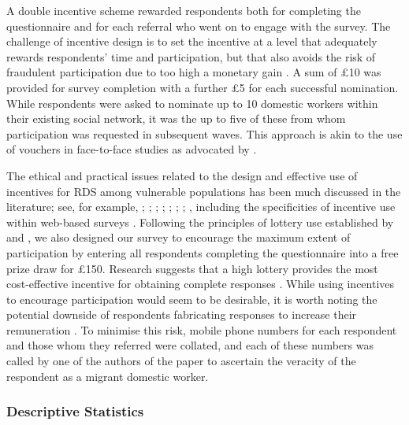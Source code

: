 \documentclass[
  12pt,
  letterpaper,
  DIV=11,
  numbers=noendperiod]{scrartcl}
\theoremstyle{plain}
\theoremstyle{definition}
\begin{document}
A double incentive scheme rewarded respondents both for completing the
questionnaire and for each referral who went on to engage with the
survey. The challenge of incentive design is to set the incentive at a
level that adequately rewards respondents' time and participation, but
that also avoids the risk of fraudulent participation due to too high a
monetary gain \autocite{jordan_overcoming_2020}. A sum of £10 was
provided for survey completion with a further £5 for each successful
nomination. While respondents were asked to nominate up to 10 domestic
workers within their existing social network, it was the up to five of
these from whom participation was requested in subsequent waves. This
approach is akin to the use of vouchers in face-to-face studies as
advocated by \textcite{thompson_new_2020}.

The ethical and practical issues related to the design and effective use
of incentives for RDS among vulnerable populations has been much
discussed in the literature; see, for example,
\textcite{wang_respondent-driven_2005};
\textcite{abdul-quader_effectiveness_2006};
\textcite{singer_incentives_2006}; \textcite{dejong_ethical_2009};
\textcite{semaan_ethical_2009}; \textcite{brunovskis_untold_2010};
\textcite{semaan_time-space_2010}; \textcite{platt_adapting_2015},
including the specificities of incentive use within web-based surveys
\autocite{cobanoglu_effect_2003}. Following the principles of lottery
use established by \textcite{brown_you_2006} and
\textcite{laguilles_can_2011}, we also designed our survey to encourage
the maximum extent of participation by entering all respondents
completing the questionnaire into a free prize draw for £150. Research
suggests that a high lottery provides the most cost-effective incentive
for obtaining complete responses
\autocite{gajic_cost-effectiveness_2012}. While using incentives to
encourage participation would seem to be desirable, it is worth noting
the potential downside of respondents fabricating responses to increase
their remuneration \autocite{robinson_sampling_2014}. To minimise this
risk, mobile phone numbers for each respondent and those whom they
referred were collated, and each of these numbers was called by one of
the authors of the paper to ascertain the veracity of the respondent as
a migrant domestic worker.

\subsubsection{Descriptive Statistics}\label{descriptive-statistics}
\end{document}
